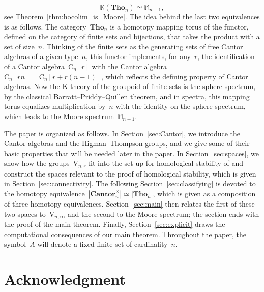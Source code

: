 \documentclass[10pt]{article}
\newcommand{\Can}{\mathbf{Cantor}}
\newcommand{\Tho}{\mathbf{Tho}}
\newcommand{\bbK}{\mathbb{K}}
\newcommand{\bbM}{\mathbb{M}}
\newcommand{\rmC}{\mathrm{C}}
\newcommand{\rmV}{\mathrm{V}}
\newcommand{\x}{\times}
\theoremstyle{definition}
\numberwithin{theorem}{section}
\numberwithin{equation}{section}
\numberwithin{figure}{section}
\begin{document}
\[
\bbK(\Tho_n)\simeq \bbM_{n-1},
\]
see Theorem~\ref{thm:hocolim_is_Moore}. The idea behind the last two equivalences is as follows. 
The category~$\Tho_n$ is a homotopy mapping torus of the functor, defined on the category of finite sets and bijections, that takes the product with a set of size~$n$. Thinking of the finite sets as the generating sets of free Cantor algebras of a given type~$n$,  this functor implements, for any~$r$, the identification of a Cantor algebra~$\rmC_{n}[r]$  with the Cantor algebra~\hbox{$\rmC_{n}[rn]=\rmC_{n}[r+r(n-1)]$}, which reflects the defining property of Cantor algebras.  Now the K-theory of the groupoid of finite sets is the sphere spectrum, by the classical Barratt--Priddy--Quillen theorem, and in spectra, this mapping torus equalizes multiplication by~$n$ with the identity on the sphere spectrum, which leads to the Moore spectrum~$\bbM_{n-1}$. 


The paper is organized as follows. In Section~\ref{sec:Cantor}, we introduce the Cantor algebras and the Higman--Thompson groups, and we give some of their basic properties that will be needed later in the paper. In Section~\ref{sec:spaces}, we show how the groups~$\rmV_{n,r}$ fit into the set-up for homological stability of \cite{Randal-Williams+Wahl} and construct the spaces relevant to the proof of homological stability, which is given in Section~\ref{sec:connectivity}. The following Section~\ref{sec:classifying} is devoted to the homotopy equivalence~\hbox{$|\Can_n^\x|\simeq |\Tho_n|$}, which is given as a composition of three homotopy equivalences. Section~\ref{sec:main} then relates the first of these two spaces to~$\rmV_{n,\infty}$ and the second to the Moore spectrum; the section ends with the proof of the main theorem. 
Finally, Section~\ref{sec:explicit} draws the computational consequences of our main theorem. Throughout the paper, the symbol~$A$ will denote a fixed finite set of cardinality~$n$. 








\section*{Acknowledgment}
\end{document}
